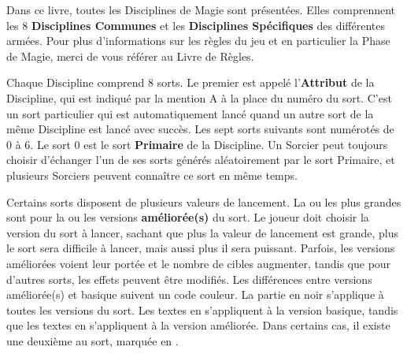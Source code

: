 \vspace*{1.5cm}

\spaceaftersection{}

Dans ce livre, toutes les Disciplines de Magie sont présentées. Elles comprennent les 8 \textbf{Disciplines Communes} et les \textbf{Disciplines Spécifiques} des différentes armées. Pour plus d'informations sur les règles du jeu et en particulier la Phase de Magie, merci de vous référer au Livre de Règles.

\vspace*{10pt}
Chaque Discipline comprend 8 sorts. Le premier est appelé l’\textbf{Attribut} de la Discipline, qui est indiqué par la mention \og A \fg{} à la place du numéro du sort. C'est un sort particulier qui est automatiquement lancé quand un autre sort de la même Discipline est lancé avec succès. Les sept sorts suivants sont numérotés de 0 à 6. Le sort 0 est le sort \textbf{Primaire} de la Discipline. Un Sorcier peut toujours choisir d'échanger l'un de ses sorts générés aléatoirement par le sort Primaire, et plusieurs Sorciers peuvent connaître ce sort en même temps.

\vspace*{10pt}
Certains sorts disposent de plusieurs valeurs de lancement. La ou les plus grandes sont pour la  ou les versions \textbf{améliorée(s)} du sort. Le joueur doit choisir la version du sort à lancer, sachant que plus la valeur de lancement est grande, plus le sort sera difficile à lancer, mais aussi plus il sera puissant. Parfois, les versions améliorées voient leur portée et le nombre de cibles augmenter, tandis que pour d'autres sorts, les effets peuvent être modifiés. Les différences entre versions améliorée(s) et basique suivent un code couleur. La partie en noir s'applique à toutes les versions du sort. Les textes en  s'appliquent à la version basique, tandis que les textes en  s'appliquent à la version améliorée. Dans certains cas, il existe une deuxième \augment{} au sort, marquée en . 

